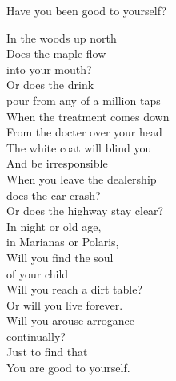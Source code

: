 Have you been good to yourself?

In the woods up north\\
Does the maple flow\\
into your mouth?\\
Or does the drink\\
pour from any of a million taps\\
When the treatment comes down\\
From the docter over your head\\
The white coat will blind you\\
And be irresponsible\\
When you leave the dealership\\
does the car crash?\\
Or does the highway stay clear?\\
In night or old age,\\
in Marianas or Polaris,\\
Will you find the soul\\
of your child\\
Will you reach a dirt table?\\
Or will you live forever.\\
Will you arouse arrogance\\
continually?\\
Just to find that\\
You are good to yourself.\\

